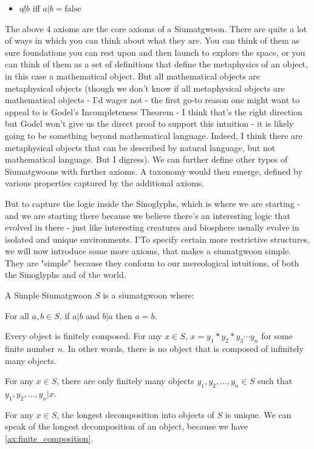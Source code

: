 \begin{itemize}
\item $a\not|b$ iff $a|b = \text{false}$
\end{itemize}

The above 4 axioms are the core axioms of a Siumatgwoon. There are quite a lot of ways in which you can think about what they are. You can think of them as sure foundations you can rest upon and then launch to explore the space, or you can think of them as a set of definitions that define the metaphysics of an object, in this case a mathematical object. But all mathematical objects are metaphysical objects (though we don't know if all metaphysical objects are mathematical objects - I'd wager not - the first go-to reason one might want to appeal to is Godel's Incompleteness Theorem - I think that's the right direction but Godel won't give us the direct proof to support this intuition - it is likely going to be something beyond mathematical language. Indeed, I think there are metaphysical objects that can be described by natural language, but not mathematical language. But I digress). We can further define other types of Siumatgwoons with further axioms. A taxonomy would then emerge, defined by various properties captured by the additional axioms.

But to capture the logic inside the Sinoglyphs, which is where we are starting - and we are starting there because we believe there's an interesting logic that evolved in there - just like interesting creatures and biosphere usually evolve in isolated and unique environments. I'To specify certain more restrictive structures, we will now introduce some more axioms, that makes a siumatgwoon simple. They are "simple" because they conform to our mereological intuitions, of both the Sinoglyphs and of the world.

\begin{definition}\label{def:simple}
A Simple Siumatgwoon $S$ is a siumatgwoon where:
\begin{axiom}[Antisymmetry]\label{ax:antisymmetry}
    For all $a,b\in S$, if $a|b$ and $b|a$ then $a=b$.
\end{axiom}
\begin{axiom}\label{ax:finite_composition} 
    Every object is finitely composed. For any $x\in S$, $x = y_1 * y_2 * y_3 \cdots y_n$ for some finite number $n$.
    In other words, there is no object that is composed of infinitely many objects.
\end{axiom}
    
\begin{axiom}\label{ax:finite_constitution} 
For any $x \in S$, there are only finitely many objects $y_1, y_2, \ldots, y_n \in S$ such that $y_1, y_2, \ldots, y_n | x$.
\end{axiom}

\begin{axiom}\label{ax:unique-decomposition} 
    For any $x\in S$, the longest decomposition into objects of $S$ is unique. We can speak of the longest decomposition of an object, because we have \ref{ax:finite_composition}.
\end{axiom}
\end{definition}


